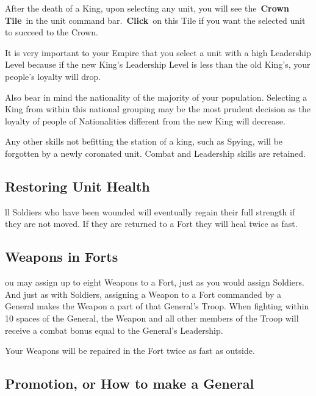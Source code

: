 After the death of a King, upon selecting any unit, you will see the \textbf{Crown Tile} in the unit command bar. \textbf{Click} on this Tile if you want the selected unit to succeed to the Crown.

It is very important to your Empire that you select a unit with a high Leadership Level because if the new King’s Leadership Level is less than the old King’s, your people’s loyalty will drop.

Also bear in mind the nationality of the majority of your population. Selecting a King from within this national grouping may be the most prudent decision as the loyalty of people of Nationalities different from the new King will decrease.

Any other skills not befitting the station of a king, such as Spying, will be forgotten by a newly coronated unit. Combat and Leadership skills are retained.

\subsection{Restoring Unit Health}


ll Soldiers who have been wounded will eventually regain their full strength if they are not moved. If they are returned to a Fort they will heal twice as fast.

\subsection{Weapons in Forts}


ou may assign up to eight Weapons to a Fort, just as you would assign Soldiers. And just as with Soldiers, assigning a Weapon to a Fort commanded by a General makes the Weapon a part of that General’s Troop. When fighting within 10 spaces of the General, the Weapon and all other members of the Troop will receive a combat bonus equal to the General’s Leadership.

Your Weapons will be repaired in the Fort twice as fast as outside.

\subsection{Promotion, or How to make a General}


